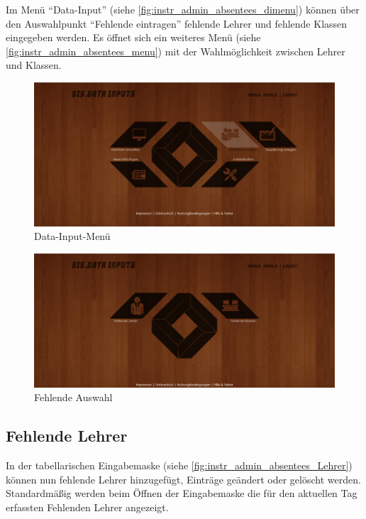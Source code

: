 Im Menü \enquote{Data-Input} (siehe \autoref{fig:instr_admin_absentees_dimenu}) können über den Auswahlpunkt \enquote{Fehlende eintragen}  fehlende Lehrer und fehlende Klassen eingegeben werden. Es öffnet sich ein weiteres Menü (siehe \autoref{fig:instr_admin_absentees_menu}) mit der Wahlmöglichkeit zwischen Lehrer und Klassen.
\begin{figure}[H]
\centering
\includegraphics[keepaspectratio=true, width=14cm]{images/screenshots/data-inputs2.png}
\caption{Data-Input-Menü}
\label{fig:instr_admin_absentees_dimenu}
\end{figure}
\begin{figure}[H]
\centering
\includegraphics[keepaspectratio=true, width=14cm]{images/screenshots/data-inputs_absentees.png}
\caption{Fehlende Auswahl}
\label{fig:instr_admin_absentees_menu}
\end{figure}
\subsection{Fehlende Lehrer}
\label{sec:instr_admin_absentees_teacher}
In der tabellarischen Eingabemaske (siehe \autoref{fig:instr_admin_absentees_Lehrer}) können nun fehlende Lehrer hinzugefügt, Einträge geändert oder gelöscht werden. Standardmäßig werden beim Öffnen der Eingabemaske die für den aktuellen Tag erfassten Fehlenden Lehrer angezeigt.
